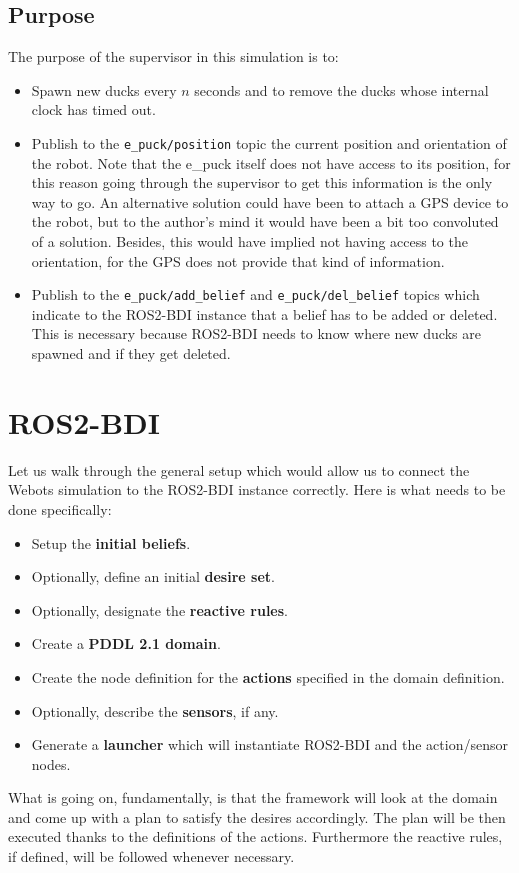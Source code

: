 \subsection{Purpose}
The purpose of the supervisor in this simulation is to:
\begin{itemize}
    \item Spawn new ducks every $n$ seconds and to remove the ducks whose internal clock has timed out. 
    \item Publish to the \texttt{e\_puck/position} topic the current position and orientation of the robot. Note that the e\_puck itself does not have access to its position, for this reason going through the supervisor to get this information is the only way to go. An alternative solution could have been to attach a GPS device to the robot, but to the author's mind it would have been a bit too convoluted of a solution. Besides, this would have implied not having access to the orientation, for the GPS does not provide that kind of information. 
    \item Publish to the \texttt{e\_puck/add\_belief} and \texttt{e\_puck/del\_belief} topics which indicate to the ROS2-BDI instance that a belief has to be added or deleted. This is necessary because ROS2-BDI needs to know where new ducks are spawned and if they get deleted.
\end{itemize}
\section{ROS2-BDI}
Let us walk through the general setup which would allow us to connect the Webots simulation to the ROS2-BDI instance correctly. Here is what needs to be done specifically: 
\begin{itemize}
    \item Setup the \textbf{initial beliefs}.
    \item Optionally, define an initial \textbf{desire set}.
    \item Optionally, designate the \textbf{reactive rules}.
    \item Create a \textbf{PDDL 2.1 domain}.
    \item Create the node definition for the \textbf{actions} specified in the domain definition.
    \item Optionally, describe the \textbf{sensors}, if any.
    \item Generate a \textbf{launcher} which will instantiate ROS2-BDI and the action/sensor nodes. 
\end{itemize}
What is going on, fundamentally, is that the framework will look at the domain and come up with a plan to satisfy the desires accordingly. The plan will be then executed thanks to the definitions of the actions. Furthermore the reactive rules, if defined, will be followed whenever necessary.
